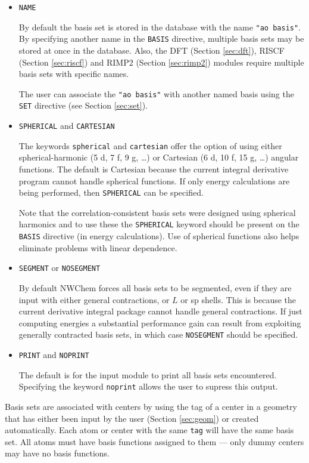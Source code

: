 \begin{itemize}
\item {\tt NAME}

By default the basis set is stored in the database with the name
\verb+"ao basis"+.  By specifying another name in the \verb+BASIS+
directive, multiple basis sets may be stored at once in the database.
Also, the DFT (Section \ref{sec:dft}), RISCF (Section \ref{sec:riscf})
and RIMP2 (Section \ref{sec:rimp2}) modules require multiple basis
sets with specific names.

The user can associate the \verb+"ao basis"+ with another named basis
using the \verb+SET+ directive (see Section \ref{sec:set}).  

\item {{\tt SPHERICAL} and {\tt CARTESIAN}}

The keywords \verb+spherical+ and \verb+cartesian+ offer the option of
using either spherical-harmonic (5 d, 7 f, 9 g, \ldots) or Cartesian
(6 d, 10 f, 15 g, \ldots) angular functions.  The default is
Cartesian because the current integral derivative program cannot
handle spherical functions.  If only energy calculations are being
performed, then {\tt SPHERICAL} can be specified.  

Note that the correlation-consistent basis sets were designed using
spherical harmonics and to use these the \verb+SPHERICAL+ keyword
should be present on the \verb+BASIS+ directive (in energy
calculations).  Use of spherical functions also helps eliminate
problems with linear dependence.


\item {{\tt SEGMENT} or {\tt NOSEGMENT}}

By default NWChem forces all basis sets to be segmented, 
even if they are input with either general contractions, or $L$ or sp
shells. This is because the current derivative integral package cannot
handle general contractions.  If just computing energies a substantial
performance gain can result from exploiting generally contracted basis
sets, in which case {\tt NOSEGMENT} should be specified.

\item {{\tt PRINT} and {\tt NOPRINT}}

The default is for the input module to print all basis sets encountered.
Specifying the keyword \verb+noprint+ allows the user to supress this output.

\end{itemize}

Basis sets are associated with centers by using the tag of a center in
a geometry that has either been input by the user (Section
\ref{sec:geom}) or created automatically.  Each atom or center with
the same \verb+tag+ will have the same basis set.  All atoms must have
basis functions assigned to them --- only dummy centers may have no
basis functions.

